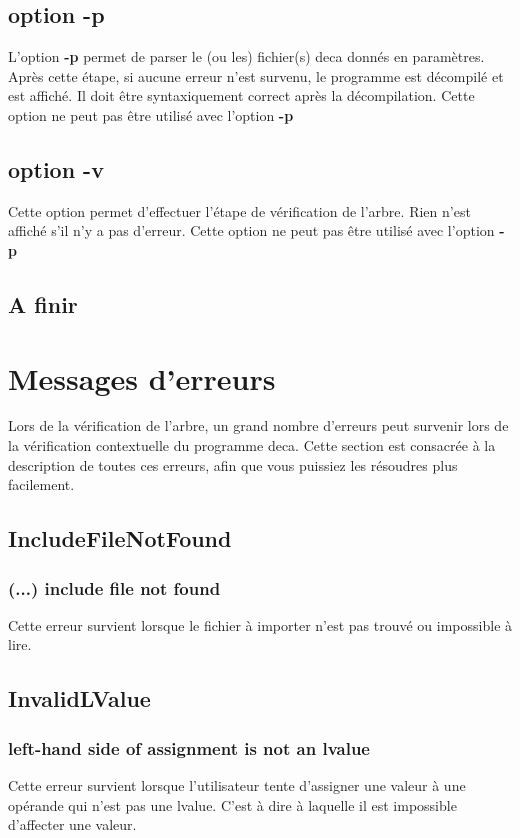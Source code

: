 \documentclass[12pt, a4paper, one side]{article}
\begin{document}
\subsection{option -p}

L'option \textbf{-p} permet de parser le (ou les) fichier(s) deca donnés en paramètres.
Après cette étape, si aucune erreur n'est survenu, le programme est décompilé et est
affiché. Il doit être syntaxiquement correct après la décompilation. Cette option ne peut
pas être utilisé avec l'option \textbf{-p}

\subsection{option -v}

Cette option permet d'effectuer l'étape de vérification de l'arbre. Rien n'est affiché s'il
n'y a pas d'erreur. Cette option ne peut pas être utilisé avec l'option \textbf{-p}

\subsection{A finir }

\section{Messages d'erreurs}

Lors de la vérification de l'arbre, un grand nombre d'erreurs peut survenir lors de la vérification
contextuelle du programme deca. Cette section est consacrée à la description de toutes ces erreurs,
afin que vous puissiez les résoudres plus facilement.

\subsection{IncludeFileNotFound}
\subsubsection{(...) include file not found}
Cette erreur survient lorsque le fichier à importer n'est pas trouvé ou impossible à lire.


\subsection{InvalidLValue}
\subsubsection{left-hand side of assignment is not an lvalue}
Cette erreur survient lorsque l'utilisateur tente d'assigner une valeur à une opérande qui n'est pas une lvalue. C'est à dire à laquelle il est impossible d'affecter une valeur.
\end{document}
